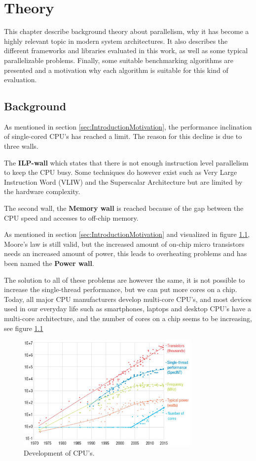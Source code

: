 
\chapter{Theory}
This chapter describe background theory about parallelism, why it has become a highly relevant topic in modern system architectures. It also describes the different frameworks and libraries evaluated in this work, as well as some typical parallelizable problems. Finally, some suitable benchmarking algorithms are presented and a motivation why each algorithm is suitable for this kind of evaluation.

\section{Background} 
As mentioned in section \ref{sec:IntroductionMotivation}, the performance inclination of single-cored CPU's has reached a limit. The reason for this decline is due to three walls.

The \textbf{ILP-wall} which states that there is not enough instruction level parallelism to keep the CPU busy. Some techniques do however exist such as Very Large Instruction Word (VLIW) and the Superscalar Architecture but are limited by the hardware complexity.

The second wall, the \textbf{Memory wall} is reached because of the gap between the CPU speed and accesses to off-chip memory.

As mentioned in section \ref{sec:IntroductionMotivation} and visualized in figure \ref{fig:CPUstats}, Moore's law is still valid, but the increased amount of on-chip micro transistors needs an increased amount of power, this leads to overheating problems and has been named the \textbf{Power wall}.

The solution to all of these problems are however the same, it is not possible to increase the single-thread performance, but we can put more cores on a chip. Today, all major CPU manufacturers develop multi-core CPU's, and most devices used in our everyday life such as smartphones, laptops 
and desktop CPU's have a multi-core architecture, and the number of cores on a chip seems to be increasing, see figure \ref{fig:CPUstats}

\begin{figure}[!h]
    \centering
    \includegraphics[width=0.8\textwidth]{Introduction/Figs/CPUStats.png}
    \caption{Development of CPU's. \cite{CPUStats}}
    \label{fig:CPUstats}
\end{figure}

